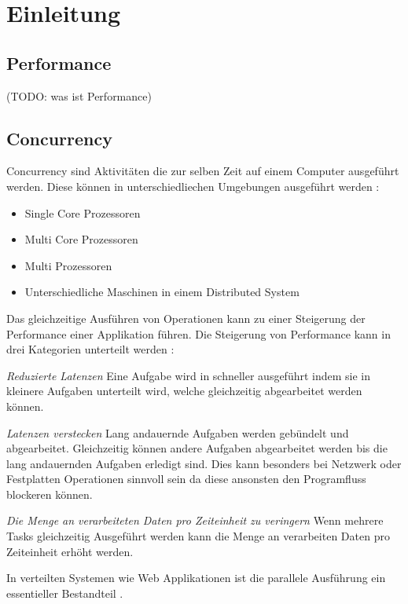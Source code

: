 \section{Einleitung}
\label{section:Einleitung}


\subsection{Performance}
(TODO: was ist Performance)

\subsection{Concurrency}
\label{section:concurrency}

Concurrency sind Aktivitäten die zur selben Zeit auf einem Computer ausgeführt werden. Diese können in unterschiedliechen Umgebungen ausgeführt werden \cite[p. 14]{Erb2012}:

\begin{itemize}
  \item Single Core Prozessoren
  \item Multi Core Prozessoren
  \item Multi Prozessoren
  \item Unterschiedliche Maschinen in einem Distributed System
\end{itemize}

Das gleichzeitige Ausführen von Operationen kann zu einer Steigerung der Performance einer Applikation führen. Die Steigerung von Performance kann in drei Kategorien unterteilt werden \cite[p. 18]{Can08}:

\emph{Reduzierte Latenzen}
	Eine Aufgabe wird in schneller ausgeführt indem sie in kleinere Aufgaben unterteilt wird, welche gleichzeitig abgearbeitet werden können. \cite[p. 18]{Can08}

\emph{Latenzen verstecken}
	Lang andauernde Aufgaben werden gebündelt und abgearbeitet. Gleichzeitig können andere Aufgaben abgearbeitet werden bis die lang andauernden Aufgaben erledigt sind. Dies kann besonders bei Netzwerk oder Festplatten Operationen sinnvoll sein da diese ansonsten den Programfluss blockeren können.

\emph{Die Menge an verarbeiteten Daten pro Zeiteinheit zu veringern}
	Wenn mehrere Tasks gleichzeitig Ausgeführt werden kann die Menge an verarbeiten Daten pro Zeiteinheit erhöht werden.	

In verteilten Systemen wie Web Applikationen ist die parallele Ausführung ein essentieller Bestandteil \cite[p. 14]{Erb2012}. 

